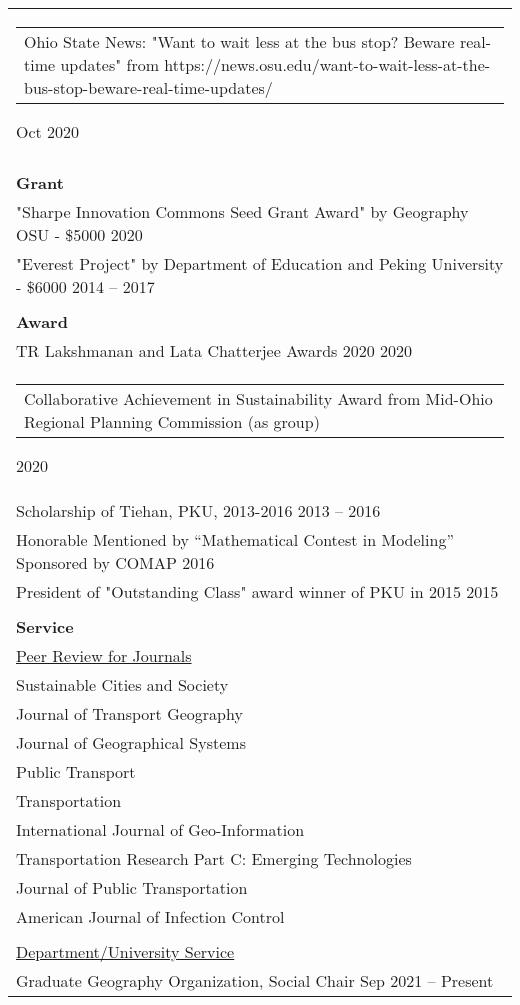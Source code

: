 \documentclass[letterpaper, 11pt]{article}
\begin{document}
\begin{longtable}{p{6.5in}}
\begin{tabular}{p{5in}}
Ohio State News: "Want to wait less at the bus stop? Beware real-time updates" from https://news.osu.edu/want-to-wait-less-at-the-bus-stop-beware-real-time-updates/ 
\end{tabular} \hfill Oct 2020 \\\\

\textbf{Grant} \\
"Sharpe Innovation Commons Seed Grant Award" by Geography OSU - \$5000 \hfill 2020 \\
"Everest Project" by Department of Education and Peking University - \$6000 \hfill 2014 -- 2017 \\\\

\textbf{Award} \\
TR Lakshmanan and Lata Chatterjee Awards 2020 \hfill 2020 \\
\begin{tabular}{p{5in}}
Collaborative Achievement in Sustainability Award from Mid-Ohio Regional Planning Commission (as group) \end{tabular}\hfill 2020 \\
Scholarship of Tiehan, PKU, 2013-2016 \hfill 2013 -- 2016 \\
Honorable Mentioned by “Mathematical Contest in Modeling” Sponsored by COMAP \hfill 2016 \\
President of "Outstanding Class" award winner of PKU in 2015 \hfill 2015 \\\\

\textbf{Service}\\
\underline{Peer Review for Journals}\\
Sustainable Cities and Society \\
Journal of Transport Geography \\
Journal of Geographical Systems \\
Public Transport \\
Transportation \\
International Journal of Geo-Information \\
Transportation Research Part C: Emerging Technologies \\ 
Journal of Public Transportation \\ 
American Journal of Infection Control \\\\


\underline{Department/University Service}\\
Graduate Geography Organization, Social Chair \hfill Sep 2021 -- Present\\


\end{longtable}
\end{document}

